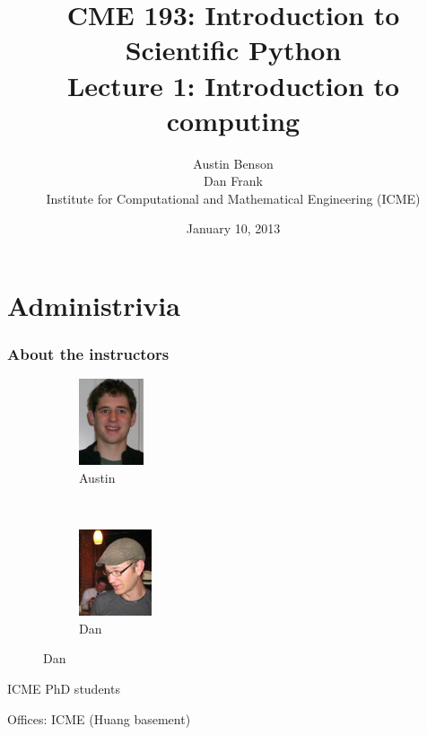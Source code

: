 \documentclass{beamer}
\title{CME 193: Introduction to Scientific Python \\
Lecture 1: Introduction to computing}
\author{Austin Benson \\
\vspace{0.1in}
Dan Frank \\
\vspace{0.1in}
Institute for Computational and Mathematical Engineering (ICME)}
\date{January 10, 2013}
\begin{document}
\maketitle

\section{Administrivia}
\begin{frame}
\frametitle{About the instructors}

\begin{figure}
        \centering
	\begin{subfigure}[b]{0.45\textwidth}
	\centering
	\includegraphics[height=1in]{"images/austin"}
	\caption{Austin}
	\label{fig:hw2_15a}
	\end{subfigure}
        ~ %
	\begin{subfigure}[b]{0.45\textwidth}
	\centering
	\includegraphics[height=1in]{"images/dan"}
	\caption{Dan}
	\label{fig:hw2_15b}
	\end{subfigure}
\end{figure}

ICME PhD students

Offices: ICME (Huang basement)
\end{frame}


\end{document}
